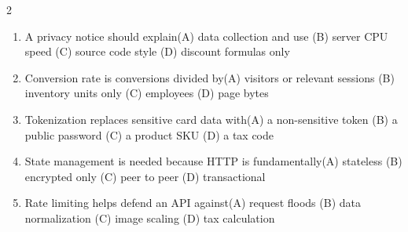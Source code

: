 \documentclass[a4paper]{article}
\begin{document}
\begin{multicols*}{2}
\begin{enumerate}[resume]
\item A privacy notice should explain\newline\hspace*{0.6em}(A) data collection and use \quad (B) server CPU speed \newline\hspace*{0.6em}(C) source code style \quad (D) discount formulas only
\item Conversion rate is conversions divided by\newline\hspace*{0.6em}(A) visitors or relevant sessions \quad (B) inventory units only \newline\hspace*{0.6em}(C) employees \quad (D) page bytes
\item Tokenization replaces sensitive card data with\newline\hspace*{0.6em}(A) a non-sensitive token \quad (B) a public password \newline\hspace*{0.6em}(C) a product SKU \quad (D) a tax code
\item State management is needed because HTTP is fundamentally\newline\hspace*{0.6em}(A) stateless \quad (B) encrypted only \newline\hspace*{0.6em}(C) peer to peer \quad (D) transactional
\item Rate limiting helps defend an API against\newline\hspace*{0.6em}(A) request floods \quad (B) data normalization \newline\hspace*{0.6em}(C) image scaling \quad (D) tax calculation
\end{enumerate}
\end{multicols*}
\end{document}
